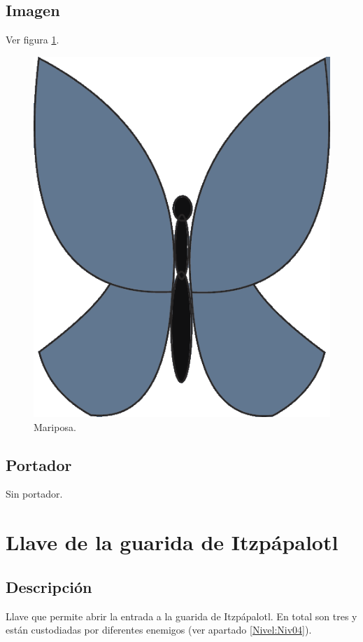 		\subsection{Imagen}
		Ver figura \ref{fig:Mariposa}.
		\begin{figure}
			\centering
			\includegraphics[height=0.2 \textheight]{Imagenes/mariposa}
			\caption{Mariposa.}
			\label{fig:Mariposa}
		\end{figure}
	\subsection{Portador}
	Sin portador. 
	
\section{Llave de la guarida de Itzpápalotl} \label{item:LlaveItz}
		\subsection{Descripción}
		
Llave que permite abrir la entrada a la guarida de Itzpápalotl. En total son tres y están custodiadas por diferentes enemigos (ver apartado \ref{Nivel:Niv04}).
